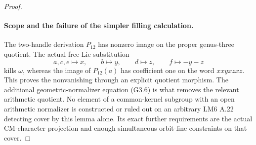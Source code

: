 \begin{proof}
\paragraph{Scope and the failure of the simpler filling calculation.}
The two-handle derivation $P_{12}$ has nonzero image on
the proper genus-three quotient. The actual free-Lie
substitution
\[
 a,c,e\mapsto x,\qquad b\mapsto y,\qquad d\mapsto z,
 \qquad f\mapsto-y-z
\]
kills $\omega$, whereas the image of $P_{12}(a)$ has
coefficient one on the word $xxyxzxz$. This proves the
nonvanishing through an explicit quotient morphism.
The additional geometric-normalizer equation (G3.6)
is what removes the relevant arithmetic quotient.
No element of a common-kernel subgroup with an open
arithmetic normalizer is constructed or ruled out on
an arbitrary LM6 A.22 detecting cover by this lemma
alone. Its exact further requirements are the actual
CM-character projection and enough simultaneous
orbit-line constraints on that cover.

\end{proof}

